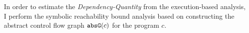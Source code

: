 
In order to estimate the \emph{Dependency-Quantity} from the execution-based analysis,
I perform the symbolic reachability bound analysis based on constructing the abstract control flow graph $\mathtt{abs}{\mathtt{G}}(c)$ for the program $c$.
